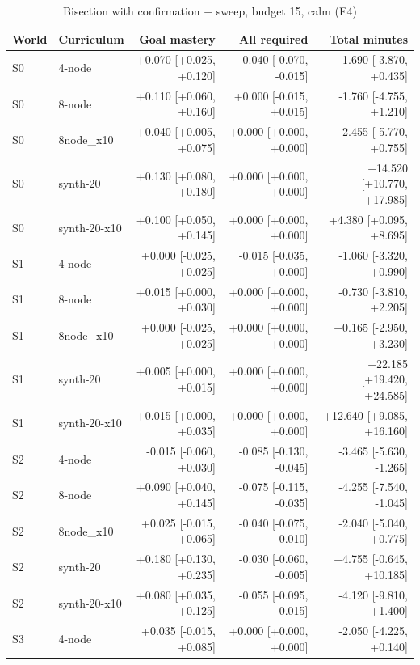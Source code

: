\begin{table}[htbp]
\centering\small
\caption{Bisection with confirmation $-$ sweep, budget 15, calm (E4)}
\label{tab:t9}
\begin{tabular}{llrrr}
\toprule
World & Curriculum & Goal mastery & All required & Total minutes \\
\midrule
S0 & 4-node & +0.070 [+0.025, +0.120] & -0.040 [-0.070, -0.015] & -1.690 [-3.870, +0.435] \\
S0 & 8-node & +0.110 [+0.060, +0.160] & +0.000 [-0.015, +0.015] & -1.760 [-4.755, +1.210] \\
S0 & 8node\_x10 & +0.040 [+0.005, +0.075] & +0.000 [+0.000, +0.000] & -2.455 [-5.770, +0.755] \\
S0 & synth-20 & +0.130 [+0.080, +0.180] & +0.000 [+0.000, +0.000] & +14.520 [+10.770, +17.985] \\
S0 & synth-20-x10 & +0.100 [+0.050, +0.145] & +0.000 [+0.000, +0.000] & +4.380 [+0.095, +8.695] \\
S1 & 4-node & +0.000 [-0.025, +0.025] & -0.015 [-0.035, +0.000] & -1.060 [-3.320, +0.990] \\
S1 & 8-node & +0.015 [+0.000, +0.030] & +0.000 [+0.000, +0.000] & -0.730 [-3.810, +2.205] \\
S1 & 8node\_x10 & +0.000 [-0.025, +0.025] & +0.000 [+0.000, +0.000] & +0.165 [-2.950, +3.230] \\
S1 & synth-20 & +0.005 [+0.000, +0.015] & +0.000 [+0.000, +0.000] & +22.185 [+19.420, +24.585] \\
S1 & synth-20-x10 & +0.015 [+0.000, +0.035] & +0.000 [+0.000, +0.000] & +12.640 [+9.085, +16.160] \\
S2 & 4-node & -0.015 [-0.060, +0.030] & -0.085 [-0.130, -0.045] & -3.465 [-5.630, -1.265] \\
S2 & 8-node & +0.090 [+0.040, +0.145] & -0.075 [-0.115, -0.035] & -4.255 [-7.540, -1.045] \\
S2 & 8node\_x10 & +0.025 [-0.015, +0.065] & -0.040 [-0.075, -0.010] & -2.040 [-5.040, +0.775] \\
S2 & synth-20 & +0.180 [+0.130, +0.235] & -0.030 [-0.060, -0.005] & +4.755 [-0.645, +10.185] \\
S2 & synth-20-x10 & +0.080 [+0.035, +0.125] & -0.055 [-0.095, -0.015] & -4.120 [-9.810, +1.400] \\
S3 & 4-node & +0.035 [-0.015, +0.085] & +0.000 [+0.000, +0.000] & -2.050 [-4.225, +0.140] \\

\end{tabular}
\end{table}
